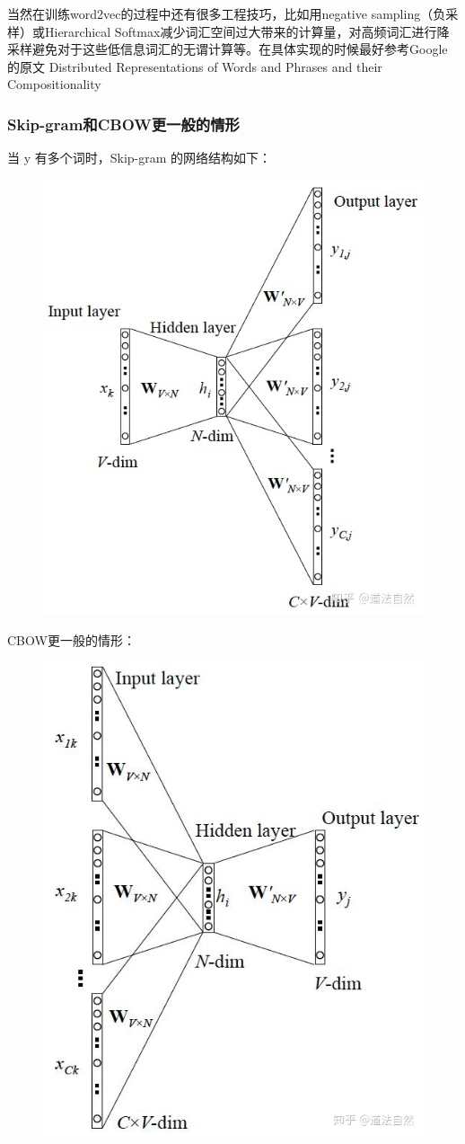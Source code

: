 \documentclass[12pt]{article}
\begin{document}
当然在训练word2vec的过程中还有很多工程技巧，比如用negative sampling（负采样）或Hierarchical Softmax减少词汇空间过大带来的计算量，对高频词汇进行降采样避免对于这些低信息词汇的无谓计算等。在具体实现的时候最好参考Google的原文 Distributed Representations of Words and Phrases and their Compositionality

\subsubsection{Skip-gram和CBOW更一般的情形\cite{Embedding_Common_Methods_In_Reference_Systems}}
当 y 有多个词时，Skip-gram 的网络结构如下：
\begin{figure}[H]
    \centering
    \includegraphics[width=.6\textwidth]{fig/Embedding_Common_Scenario_Skip_Gram.jpg}
\end{figure}

CBOW更一般的情形：
\begin{figure}[H]
    \centering
    \includegraphics[width=.6\textwidth]{fig/Embedding_Common_Scenario_CBOW.jpg}
\end{figure}
\end{document}
